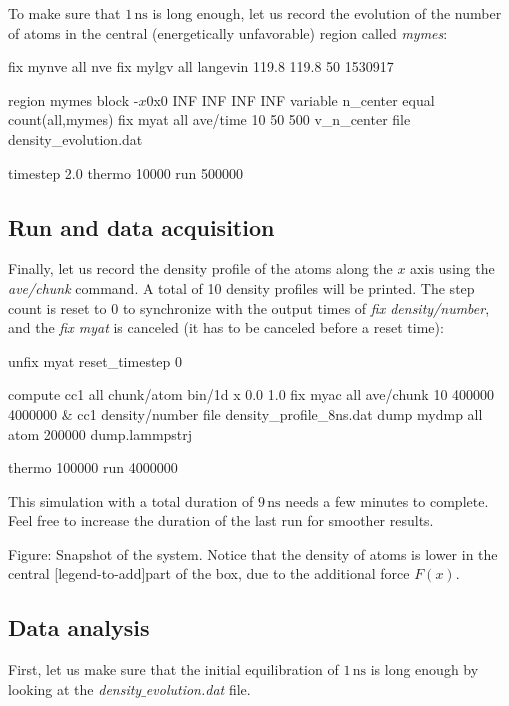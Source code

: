 \vspace{0.25cm} \noindent To make sure that $1\,\text{ns}$ is long enough, let us
record the evolution of the number of atoms in the central
(energetically unfavorable) region called \textit{mymes}:

\begin{lcverbatim}
fix mynve all nve
fix mylgv all langevin 119.8 119.8 50 1530917

region mymes block -${x0} ${x0} INF INF INF INF 
variable n_center equal count(all,mymes)
fix myat all ave/time 10 50 500 v_n_center file density_evolution.dat

timestep 2.0
thermo 10000
run 500000
\end{lcverbatim}

\subsection{Run and data acquisition}
Finally, let us record the density profile of the atoms
along the $x$ axis using the \textit{ave/chunk} command. A
total of 10 density profiles will be printed. The step count is
reset to 0 to synchronize with the output times of
\textit{fix density/number}, and the \textit{fix myat} is canceled (it has to be
canceled before a reset time):

\begin{lcverbatim}
unfix myat
reset_timestep 0

compute cc1 all chunk/atom bin/1d x 0.0 1.0
fix myac all ave/chunk 10 400000 4000000 &
    cc1 density/number file density_profile_8ns.dat
dump mydmp all atom 200000 dump.lammpstrj

thermo 100000
run 4000000
\end{lcverbatim}

\noindent This simulation with a total duration of $9\,\text{ns}$ needs a few
minutes to complete. Feel free to increase the 
duration of the last run for smoother results.

\vspace{0.25cm} Figure: Snapshot of the system. Notice that the density of atoms is lower in the central
[legend-to-add]part of the box, due to the additional force $F (x)$.

\subsection{Data analysis}
\noindent First, let us make sure that the initial equilibration of $1\,\text{ns}$
is long enough by looking at the \textit{density$\_$evolution.dat} file.

